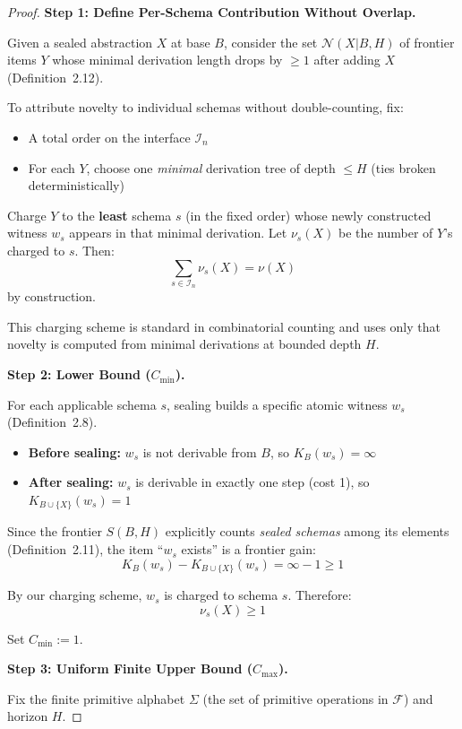 \documentclass[11pt]{article}
\theoremstyle{definition}
\theoremstyle{remark}
\begin{document}
\begin{proof}
\textbf{Step 1: Define Per-Schema Contribution Without Overlap.}

Given a sealed abstraction $X$ at base $B$, consider the set $\mathcal{N}(X|B,H)$ of frontier items $Y$
whose minimal derivation length drops by $\geq 1$ after adding $X$ (Definition~2.12).

To attribute novelty to individual schemas without double-counting, fix:
\begin{itemize}
\item A total order on the interface $\mathcal{I}_n$
\item For each $Y$, choose one \emph{minimal} derivation tree of depth $\leq H$ (ties broken deterministically)
\end{itemize}

Charge $Y$ to the \textbf{least} schema $s$ (in the fixed order) whose newly constructed witness $w_s$
appears in that minimal derivation. Let $\nu_s(X)$ be the number of $Y$'s charged to $s$. Then:
\[
\sum_{s \in \mathcal{I}_n} \nu_s(X) = \nu(X)
\]
by construction.

This charging scheme is standard in combinatorial counting and uses only that novelty is computed
from minimal derivations at bounded depth $H$.

\textbf{Step 2: Lower Bound ($C_{\min}$).}

For each applicable schema $s$, sealing builds a specific atomic witness $w_s$ (Definition~2.8).

\begin{itemize}
\item \textbf{Before sealing:} $w_s$ is not derivable from $B$, so $K_B(w_s) = \infty$
\item \textbf{After sealing:} $w_s$ is derivable in exactly one step (cost 1), so $K_{B \cup \{X\}}(w_s) = 1$
\end{itemize}

Since the frontier $S(B,H)$ explicitly counts \emph{sealed schemas} among its elements (Definition~2.11),
the item ``$w_s$ exists'' is a frontier gain:
\[
K_B(w_s) - K_{B \cup \{X\}}(w_s) = \infty - 1 \geq 1
\]

By our charging scheme, $w_s$ is charged to schema $s$. Therefore:
\[
\nu_s(X) \geq 1
\]

Set $C_{\min} := 1$.

\textbf{Step 3: Uniform Finite Upper Bound ($C_{\max}$).}

Fix the finite primitive alphabet $\Sigma$ (the set of primitive operations in $\mathcal{F}$) and horizon $H$.


\end{proof}
\end{document}
